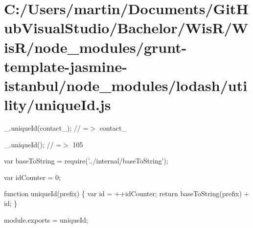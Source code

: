 \hypertarget{_c_1_2_users_2martin_2_documents_2_git_hub_visual_studio_2_bachelor_2_wis_r_2_wis_r_2node_module62941a02f56a8cf500f667d4a5cc50d7}{}\section{C\+:/\+Users/martin/\+Documents/\+Git\+Hub\+Visual\+Studio/\+Bachelor/\+Wis\+R/\+Wis\+R/node\+\_\+modules/grunt-\/template-\/jasmine-\/istanbul/node\+\_\+modules/lodash/utility/unique\+Id.\+js}
\+\_\+.\+unique\+Id(\textquotesingle{}contact\+\_\+\textquotesingle{}); // =$>$ \textquotesingle{}contact\+\_\textquotesingle{}

\+\_\+.\+unique\+Id(); // =$>$ \textquotesingle{}105\textquotesingle{}


\begin{DoxyCodeInclude}
var baseToString = require(\textcolor{stringliteral}{'../internal/baseToString'});

var idCounter = 0;

\textcolor{keyword}{function} uniqueId(prefix) \{
  var \textcolor{keywordtype}{id} = ++idCounter;
  \textcolor{keywordflow}{return} baseToString(prefix) + id;
\}

module.exports = uniqueId;
\end{DoxyCodeInclude}
 